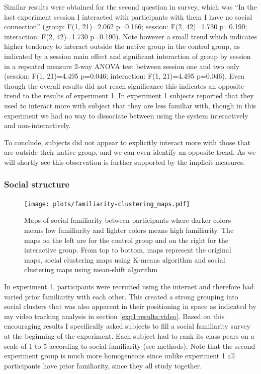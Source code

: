 \documentclass[a4paper,11pt]{article}
\begin{document}
{Similar results were obtained for the second question in survey, which was ``In the last experiment session I interacted with participants with them I have no social connection'' (group: F(1, 21)=2.062 p=0.166; session: F(2, 42)=1.730 p=0.190; interaction: F(2, 42)=1.730 p=0.190).
Note however a small trend which indicates higher tendency to interact outside the native group in the control group, as indicated by a session main effect and significant interaction of group by session in a repeated measure 2-way ANOVA test between session one and two only (session: F(1, 21)=4.495 p=0.046; interaction: F(1, 21)=4.495 p=0.046).
Even though the overall results did not reach significance this indicates an opposite trend to the results of experiment 1.
In experiment 1 subjects reported that they used to interact more with subject that they are less familiar with, though in this experiment we had no way to dissociate between using the system interactively and non-interactively.

To conclude, subjects did not appear to explicitly interact more with those that are outside their native group, and we can even identify an opposite trend.
As we will shortly see this observation is further supported by the implicit measures.

\subsubsection{Social structure}\label{results:social_structure}

\begin{figure}[!htb]
    \centering
    \texttt{[image: plots/familiarity-clustering\_maps.pdf]}
    \caption{Maps of social familiarity between participants where darker colors means low familiarity and lighter colors means high familiarity. The maps on the left are for the control group and on the right for the interactive group. From top to bottom, maps represent the original maps, social clustering maps using K-means algorithm and social clustering maps using mean-shift algorithm}\label{plot:familiarity-clustering_maps}
\end{figure}

In experiment 1, participants were recruited using the internet and therefore had varied prior familiarity with each other.
This created a strong grouping into social clusters that was also apparent in their positioning in space as indicated by my video tracking analysis in section \ref{exp1:results:video}.
Based on this encouraging results I specifically asked subjects to fill a social familiarity survey at the beginning of the experiment.
Each subject had to rank its class pears on a scale of 1 to 5 according to social familiarity (see methods).
Note that the second experiment group is much more homogeneous since unlike experiment 1 all participants have prior familiarity, since they all study together.

}
\end{document}
